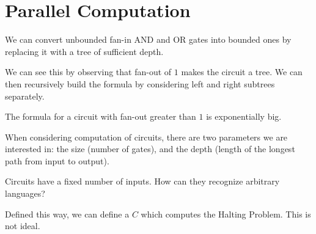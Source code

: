 



\section*{Parallel Computation}




We can convert unbounded fan-in AND and OR gates into bounded ones by replacing it with a tree of sufficient depth.


We can see this by observing that fan-out of $1$ makes the circuit a tree.  We can then recursively build the formula by considering left and right subtrees separately.

The formula for a circuit with fan-out greater than $1$ is exponentially big.

When considering computation of circuits, there are two parameters we are interested in: the size (number of gates), and the depth (length of the longest path from input to output).

Circuits have a fixed number of inputs.  How can they recognize arbitrary languages?  


Defined this way, we can define a $C$ which computes the Halting Problem.  This is not ideal.


